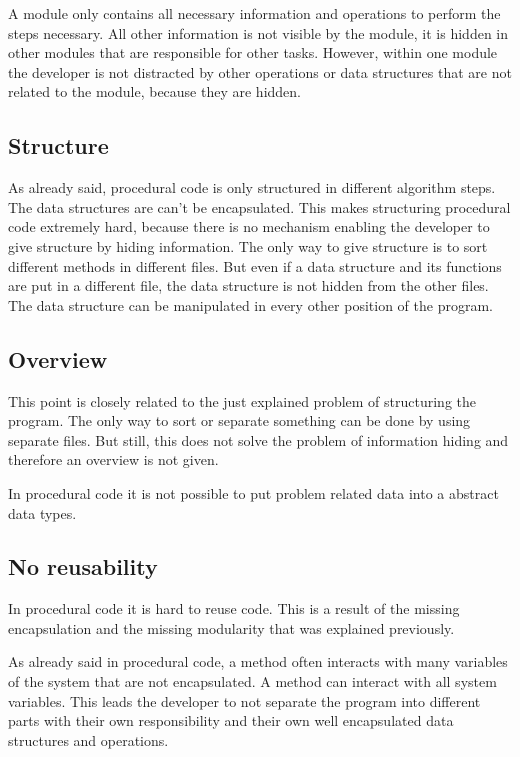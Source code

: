 A module only contains all necessary information and operations to perform the steps necessary. All other information is not visible by the module, it is hidden in other modules that are responsible for other tasks. However, within one module the developer is not distracted by other operations or data structures that are not related to the module, because they are hidden. 

\subsection*{Structure}
As already said, procedural code is only structured in different algorithm steps. The data structures are can't be encapsulated. This makes structuring procedural code extremely hard, because there is no mechanism enabling the developer to give structure by hiding information. The only way to give structure is to sort different methods in different files. But even if a data structure and its functions are put in a different file, the data structure is not hidden from the other files. The data structure can be manipulated in every other position of the program.

\subsection*{Overview}
This point is closely related to the just explained problem of structuring the program. The only way to sort or separate something can be done by using separate files. But still, this does not solve the problem of information hiding and therefore an overview is not given. 

In procedural code it is not possible to put problem related data into a abstract data types.

\subsection*{No reusability}
In procedural code it is hard to reuse code. This is a result of the missing encapsulation and the missing modularity that was explained previously.

As already said in procedural code, a method often interacts with many variables of the system that are not encapsulated. A method can interact with all system variables. This leads the developer to not separate the program into different parts with their own responsibility and their own well encapsulated data structures and operations. 


